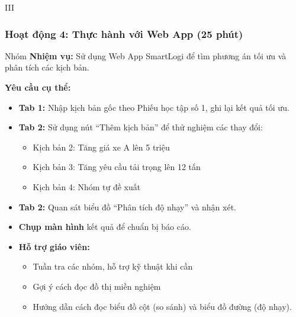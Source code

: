 \documentclass[12pt,a4paper]{article}
\begin{document}
\begin{competitionsection}{III}
\subsubsection*{Hoạt động 4: Thực hành với Web App (25 phút)}
\begin{task}{Nhóm}
\textbf{Nhiệm vụ:} Sử dụng Web App SmartLogi để tìm phương án tối ưu và phân tích các kịch bản.

\textbf{Yêu cầu cụ thể:}
\begin{itemize}[leftmargin=*,noitemsep]
\item \textbf{Tab 1:} Nhập kịch bản gốc theo Phiếu học tập số 1, ghi lại kết quả tối ưu.
\item \textbf{Tab 2:} Sử dụng nút ``Thêm kịch bản'' để thử nghiệm các thay đổi:
    \begin{itemize}
    \item Kịch bản 2: Tăng giá xe A lên 5 triệu
    \item Kịch bản 3: Tăng yêu cầu tải trọng lên 12 tấn
    \item Kịch bản 4: Nhóm tự đề xuất
    \end{itemize}
\item \textbf{Tab 2:} Quan sát biểu đồ ``Phân tích độ nhạy'' và nhận xét.
\item \textbf{Chụp màn hình} kết quả để chuẩn bị báo cáo.
\end{itemize}
\end{task}

\begin{itemize}[leftmargin=*,noitemsep]
\item \textbf{Hỗ trợ giáo viên:}
    \begin{itemize}
    \item Tuần tra các nhóm, hỗ trợ kỹ thuật khi cần
    \item Gợi ý cách đọc đồ thị miền nghiệm
    \item Hướng dẫn cách đọc biểu đồ cột (so sánh) và biểu đồ đường (độ nhạy).
    \end{itemize}
\end{itemize}


\end{competitionsection}
\end{document}
